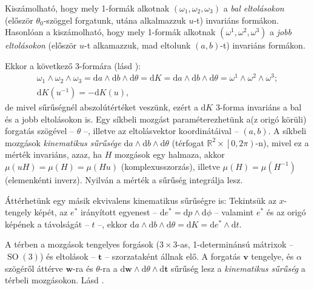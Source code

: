 \documentclass[%
	DIV=15,appendixprefix]{scrreprt}
\theoremstyle{definition}
\theoremstyle{remark}
\DeclareMathOperator{\SO}{SO}
\begin{document}
Kiszámolható, hogy mely 1-formák alkotnak  $ \left( \omega_{ 1 },{} \omega_{ 2 },{}
\omega_{ 3 } \right) $ a \emph{bal eltolásokon} (először
$ \theta_{ 0 } $-szöggel forgatunk, utána alkalmazzuk $ u $-t) invariáns formákon. Hasonlóan a
kiszámolható, hogy mely 1-formák alkotnak  $ \left( \omega^{ 1 },{} \omega^{ 2 },{}
\omega^{ 3 } \right) $ a \emph{jobb eltolásokon} (először
$ u $-t alkamazzuk, mad eltolunk $ \left( a,{} b \right) $-t) invariáns formákon.

Ekkor a következő 3-formára (lásd \cite[6.~fejezet, 3.~szakasz, 85.~oldal]{Santalo}):
\begin{gather*}
	\omega_{ 1 } \wedge \omega_{ 2 } \wedge \omega_{ 3 } = \mathrm{ d } a \wedge \mathrm{ d } b
	\wedge \mathrm{ d } \theta = \mathrm{ d } K = \mathrm{ d } a \wedge \mathrm{ d } b
	\wedge \mathrm{ d } \theta = \omega^{ 1 } \wedge \omega^{ 2 } \wedge \omega^{ 3 };\\
	\mathrm{ d } K \left( u^{ - 1 } \right)  = - \mathrm{ d } K \left( u \right),
\end{gather*}
de mivel sűrűségnél abszolútértéket veszünk, ezért a $ \mathrm{ d } K $ 3-forma invariáns a bal és a
jobb eltolásokon is.
%
Egy síkbeli mozgást paraméterezhetünk a(z origó körüli) forgatás szögével -- $ \theta $ --, illetve
az eltolásvektor
koordinátáival -- $ \left( a,{} b \right)  $. A síkbeli mozgások \emph{kinematikus sűrűsége}
$ \mathrm{ d } a \wedge \mathrm{ d } b \wedge \mathrm{ d } \theta $ (térfogat $ \mathbb{ R }^{ 2 }
\times \left.\left[ 0,{} 2 \pi \right)\right. $-n), mivel ez a mérték invariáns, azaz, ha $ H $
mozgások egy halmaza, akkor $ \mu \left( u H \right) = \mu \left( H \right) = \mu \left( Hu
\right) $ (komplexusszorzás), illetve $ \mu \left( H \right) = \mu \left( H^{ - 1 } \right) $
(elemenkénti inverz). Nyilván a mérték a sűrűség integrálja lesz.

Áttérhetünk egy másik ekvivalens kinematikus sűrűségre is: Tekintsük az $ x $-tengely képét, az
$ e^{ * } $ irányított egyenest -- $ \mathrm{ d } e^{ * } =  \mathrm{ d }p \wedge \mathrm{ d } \phi
$ -- valamint $ e^{ * } $  és az origó képének a távolságát -- $ t $ --, ekkor
$  \mathrm{ d } a \wedge \mathrm{ d } b \wedge \mathrm{ d } \theta =  \mathrm{ d } K =
\mathrm{ d }e^{ * } \wedge \mathrm{ d } t $.

A térben a mozgások tengelyes forgások ($ 3 \times  3 $-as, 1-determinánsú mátrixok -- $ \SO
\left( 3 \right) $) és eltolások -- $ \mathbf{ t } $ -- szorzataként állnak elő. A forgatás
$ \mathbf{ v } $ tengelye, és $ \alpha $ szögéről áttérve $ \mathbf{ w } $-ra és $ \theta $-ra a
$ \mathrm{ d } \mathbf{ w } \wedge \mathrm{ d } \theta \wedge \mathrm{ d } \mathbf{ t } $ sűrűség
lesz a \emph{kinematikus sűrűség} a térbeli mozgásokon.
%
Lásd \cite[6.~fejezet, 4.~szakasz, 89--90.~oldal]{Santalo}.
\end{document}
